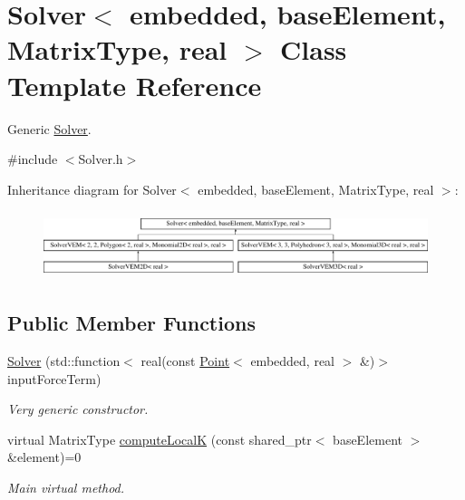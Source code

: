 \hypertarget{class_solver}{\section{\-Solver$<$ embedded, base\-Element, \-Matrix\-Type, real $>$ \-Class \-Template \-Reference}
\label{class_solver}
}


\-Generic \hyperlink{class_solver}{\-Solver}.  




{\ttfamily \#include $<$\-Solver.\-h$>$}

\-Inheritance diagram for \-Solver$<$ embedded, base\-Element, \-Matrix\-Type, real $>$\-:\begin{figure}[H]
\begin{center}
\leavevmode
\includegraphics[height=1.981132cm]{class_solver}
\end{center}
\end{figure}
\subsection*{\-Public \-Member \-Functions}
\begin{DoxyCompactItemize}
\item 
\hypertarget{class_solver_a0f04e08f93310bc82f9a2efeaffe6db3}{\hyperlink{class_solver_a0f04e08f93310bc82f9a2efeaffe6db3}{\-Solver} (std\-::function$<$ real(const \hyperlink{class_point}{\-Point}$<$ embedded, real $>$ \&)$>$ input\-Force\-Term)}\label{class_solver_a0f04e08f93310bc82f9a2efeaffe6db3}

\begin{DoxyCompactList}\small\item\em \-Very generic constructor. \end{DoxyCompactList}\item 
virtual \-Matrix\-Type \hyperlink{class_solver_a0049c7be12e2124c717d4db0128ad4b0}{compute\-Local\-K} (const shared\-\_\-ptr$<$ base\-Element $>$ \&element)=0
\begin{DoxyCompactList}\small\item\em \-Main virtual method. \end{DoxyCompactList}\end{DoxyCompactItemize}
